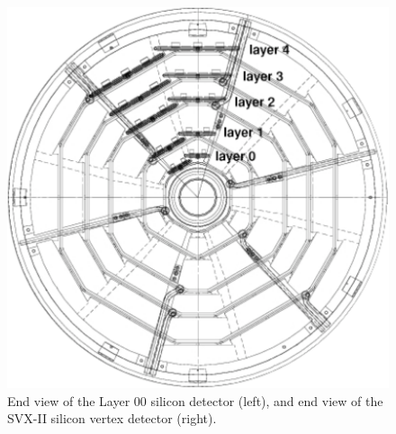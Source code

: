 \begin{figure}[htb!]
\begin{centering}
\hspace*{.2in}
\includegraphics[scale=0.4]{SvxBulkHeadEndView.pdf}
\caption{End view of the Layer 00 silicon detector (left), and end view of the SVX-II silicon vertex detector (right).}
\label{fig_SvxEndView}
\end{centering}
\end{figure}

